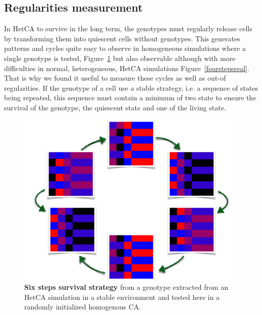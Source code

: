 \documentclass[letterpaper]{article}
\begin{document}
\subsection{Regularities measurement}
In HetCA to survive in the long term, the genotypes must regularly release cells by transforming them into quiescent cells without genotypes. This generates patterns and cycles quite easy to observe in homogeneous simulations where a single genotype is tested, Figure~\ref{foursteps} but also observable although with more difficulties in normal, heterogeneous, HetCA simulations Figure~\ref{fourstepsreal}. That is why we found it useful to measure these cycles as well as out-of regularities. If the genotype of a cell use a stable strategy, i.e. a sequence of states being repeated, this sequence must contain a minimum of two state to ensure the survival of the genotype, the quiescent state and one of the living state.  
 
\begin{figure}[h]
\centering
\includegraphics[width=0.75\columnwidth]{4steptransition}
\caption{\textbf{Six steps survival strategy} from a genotype extracted from an HetCA simulation in a stable environment and tested here in a randomly initialized homogenous CA. }
  \label{foursteps}
\end{figure}
 
\end{document}
